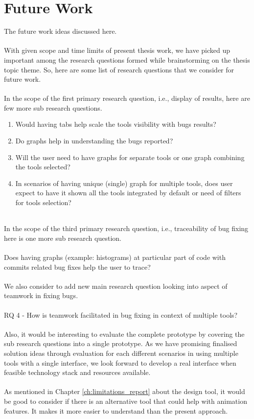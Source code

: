 \chapter{Future Work}
\label{ch:futurework_report}

The future work ideas discussed here. \\ \\

With given scope and time limits of present thesis work, we have picked up important among the research questions formed while brainstorming on the thesis topic theme. So, here are some list of research questions that we consider for future work. \\ \\

In the scope of the first primary research question, i.e., display of results, here are few more sub research questions.
\begin{enumerate}
\item Would having tabs help scale the tools visibility with bugs results?
\item Do graphs help in understanding the bugs reported?
\item Will the user need to have graphs for separate tools or one graph combining the tools selected?
\item In scenarios of having unique (single) graph for multiple tools, does user expect to have it shown all the tools integrated by default or need of filters for tools selection? \\ \\
\end{enumerate} 

In the scope of the third primary research question, i.e., traceability of bug fixing here is one more sub research question. \\ \\
\noindent Does having graphs (example: histograms) at particular part of code with commits related bug fixes help the user to trace? \\ \\

We also consider to add new main research question looking into aspect of teamwork in fixing bugs. \\ \\
\noindent RQ 4 - How is teamwork facilitated in bug fixing in context of multiple tools? \\ \\

Also, it would be interesting to evaluate the complete prototype by covering the sub research questions into a single prototype. As we have promising finalised solution ideas through evaluation for each different scenarios in using multiple tools with a single interface, we look forward to develop a real interface when feasible technology stack and resources available. \\ \\

As mentioned in Chapter \ref{ch:limitations_report} about the design tool, it would be good to consider if there is an alternative tool that could help with animation features. It makes it more easier to understand than the present approach.
